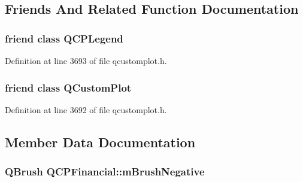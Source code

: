 \subsection{Friends And Related Function Documentation}
\hypertarget{class_q_c_p_financial_a8429035e7adfbd7f05805a6530ad5e3b}{}
\subsubsection[{Q\+C\+P\+Legend}]{\setlength{\rightskip}{0pt plus 5cm}friend class {\bf Q\+C\+P\+Legend}\hspace{0.3cm}{\ttfamily [friend]}}\label{class_q_c_p_financial_a8429035e7adfbd7f05805a6530ad5e3b}


Definition at line 3693 of file qcustomplot.\+h.

\hypertarget{class_q_c_p_financial_a1cdf9df76adcfae45261690aa0ca2198}{}
\subsubsection[{Q\+Custom\+Plot}]{\setlength{\rightskip}{0pt plus 5cm}friend class {\bf Q\+Custom\+Plot}\hspace{0.3cm}{\ttfamily [friend]}}\label{class_q_c_p_financial_a1cdf9df76adcfae45261690aa0ca2198}


Definition at line 3692 of file qcustomplot.\+h.



\subsection{Member Data Documentation}
\hypertarget{class_q_c_p_financial_acb0e31874b7a1deb56bd42e8ab3e68f2}{}
\subsubsection[{m\+Brush\+Negative}]{\setlength{\rightskip}{0pt plus 5cm}Q\+Brush Q\+C\+P\+Financial\+::m\+Brush\+Negative\hspace{0.3cm}{\ttfamily [protected]}}\label{class_q_c_p_financial_acb0e31874b7a1deb56bd42e8ab3e68f2}



